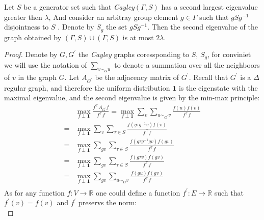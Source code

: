   \begin{claim} Let $S$ be a generator set such that \emph{Cayley}$\left( \Gamma , S \right)$ has a second largest eigenvalue greater then $\lambda$, And consider an arbitray group element $g \in \Gamma$ such that $gSg^{-1}$ disjointness to $S$ . Denote by $S_{g}$ the set $gSg^{-1}$. Then the second eigenvalue of the graph obtained by $\left( \Gamma, S \right) \cup \left( \Gamma, S \right)$ is at most $2\lambda$. \end{claim}
  \begin{proof} Denote by $G,G^{\prime}$ the \emph{Cayley} graphs coressponding to $S$, $S_{g}$, for conviniet we will use the notation of $\sum_{v\sim_{G} u}$ to denote a summation over all the neighboors of $v$ in the graph $G$. Let $A_{G^{\prime}}$ be the adjacency matrix of $G^{\prime}$. Recall that $G^{\prime}$ is a  $\Delta$ regular graph, and therefore the uniform distribution $\mathbf{1}$ is the eigenstate with the maximal eigenvalue, and the second eigenvalue is given by the min-max principle: 
  \begin{equation*}
    \begin{split}
      & \max_{f \perp \mathbf{1}} { \frac{f^{\top}A_{G^{\prime}} f  }{ f^{\top}f}} = \max_{f \perp \mathbf{1}} { \sum_{v}  \sum_{u\sim_{G^{\prime}} v}\frac{f\left( u \right) f \left( v \right)  }{ f^{\top}f}} \\
      =  & \max_{f \perp \mathbf{1}} { \sum_{v}\sum_{\tau \in S} \frac{f\left( g\tau g^{-1} v \right) f \left( v \right)  }{ f^{\top}f}} \\ = & \max_{f \perp \mathbf{1}} { \sum_{gv} \sum_{\tau \in S}\frac{f\left( g\tau g^{-1} gv \right) f \left( gv \right)  }{ f^{\top}f}} \\  
      = & \max_{f \perp \mathbf{1}} { \sum_{gv}\sum_{\tau \in S}\frac{f\left( g \tau v \right) f \left( g v \right)  }{ f^{\top}f}} \\  = & \max_{f \perp \mathbf{1}} { \sum_{gv}\sum_{ u\sim_{G} v }\frac{f\left( gu \right) f \left( gv \right)  }{ f^{\top}f}} \\
         \end{split}
  \end{equation*}
  As for any function $f : V \rightarrow \mathbb{R} $ one could define a function $f^{\prime} : E \rightarrow \mathbb{R} $ such that $f^{\prime}\left( v \right) = f\left( v \right) $ and $f^{\prime}$ preservs the norm:    
  \begin{equation*}

\end{equation*}
\end{proof}

